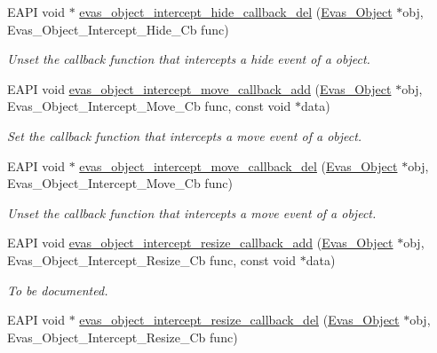 \begin{DoxyCompactItemize}
EAPI void $\ast$ \hyperlink{group__Evas__Object__Group__Interceptors_ga6586e236a6184486198775ab763e3f3c}{evas\_\-object\_\-intercept\_\-hide\_\-callback\_\-del} (\hyperlink{group__Evas__Object__Group_ga9e19e6dd1f517a0ba437c0114d3e7c97}{Evas\_\-Object} $\ast$obj, Evas\_\-Object\_\-Intercept\_\-Hide\_\-Cb func)
\begin{DoxyCompactList}\small\item\em Unset the callback function that intercepts a hide event of a object. \item\end{DoxyCompactList}\item 
EAPI void \hyperlink{group__Evas__Object__Group__Interceptors_ga08de22649a49981f9e10bf0da91a3ea6}{evas\_\-object\_\-intercept\_\-move\_\-callback\_\-add} (\hyperlink{group__Evas__Object__Group_ga9e19e6dd1f517a0ba437c0114d3e7c97}{Evas\_\-Object} $\ast$obj, Evas\_\-Object\_\-Intercept\_\-Move\_\-Cb func, const void $\ast$data)
\begin{DoxyCompactList}\small\item\em Set the callback function that intercepts a move event of a object. \item\end{DoxyCompactList}\item 
EAPI void $\ast$ \hyperlink{group__Evas__Object__Group__Interceptors_ga74c91ac985423daab22a89c4399c1d1d}{evas\_\-object\_\-intercept\_\-move\_\-callback\_\-del} (\hyperlink{group__Evas__Object__Group_ga9e19e6dd1f517a0ba437c0114d3e7c97}{Evas\_\-Object} $\ast$obj, Evas\_\-Object\_\-Intercept\_\-Move\_\-Cb func)
\begin{DoxyCompactList}\small\item\em Unset the callback function that intercepts a move event of a object. \item\end{DoxyCompactList}\item 
EAPI void \hyperlink{group__Evas__Object__Group__Interceptors_gac2ff36ae29a8e23617426f29a0c1fcd5}{evas\_\-object\_\-intercept\_\-resize\_\-callback\_\-add} (\hyperlink{group__Evas__Object__Group_ga9e19e6dd1f517a0ba437c0114d3e7c97}{Evas\_\-Object} $\ast$obj, Evas\_\-Object\_\-Intercept\_\-Resize\_\-Cb func, const void $\ast$data)
\begin{DoxyCompactList}\small\item\em To be documented. \item\end{DoxyCompactList}\item 
EAPI void $\ast$ \hyperlink{group__Evas__Object__Group__Interceptors_ga4e97fa796c926741eb36e8394cb165c3}{evas\_\-object\_\-intercept\_\-resize\_\-callback\_\-del} (\hyperlink{group__Evas__Object__Group_ga9e19e6dd1f517a0ba437c0114d3e7c97}{Evas\_\-Object} $\ast$obj, Evas\_\-Object\_\-Intercept\_\-Resize\_\-Cb func)

\end{DoxyCompactItemize}
